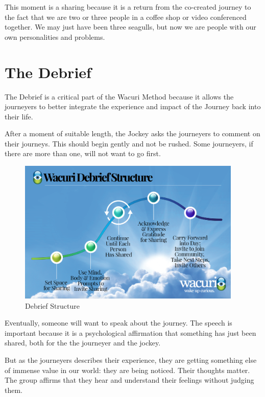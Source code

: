 \documentclass[12pt]{book}
\begin{document}
This moment is a sharing because it is a return from the co-created journey to the fact that we are two or three people in a coffee shop or video conferenced together. We may just have been three seagulls, but now we are people with our own personalities and problems.
				
			
		




\chapter{The Debrief}

The Debrief is a critical part of the Wacuri Method because it allows the journeyers to better integrate the experience and impact of the Journey back into their life.
					
After a moment of suitable length, the Jockey asks the journeyers to comment on their journeys. This should begin gently and not be rushed. Some journeyers, if there are more than one, will not want to go first.

\begin{figure}
  \centering
     \includegraphics[width=0.95\textwidth]{WacuriFigures/Wacuri-Debrief-Structure.png}
     \caption{Debrief Structure}
  \label{fig:debrief}     
\end{figure}

Eventually, someone will want to speak about the journey. The speech is important because it is a psychological affirmation that something has just been shared, both for the the journeyer and the jockey.
					
But as the journeyers describes their experience, they are getting something else of immense value in our world: they are being noticed. Their thoughts matter. The group affirms that they hear and understand their feelings without judging them.
					
\end{document}
